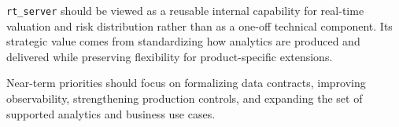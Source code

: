 \documentclass[10pt]{article}
\begin{document}
\vspace{1.8em}

\begin{tcolorbox}[colback=brandblue, coltext=white, fonttitle=\bfseries, title=Current Position and Next Steps, arc=2mm]
\texttt{rt\_server} should be viewed as a reusable internal capability for real-time valuation and risk distribution rather than as a one-off technical component. Its strategic value comes from standardizing how analytics are produced and delivered while preserving flexibility for product-specific extensions.

\vspace{0.8em}

Near-term priorities should focus on formalizing data contracts, improving observability, strengthening production controls, and expanding the set of supported analytics and business use cases.
\end{tcolorbox}
\end{document}
